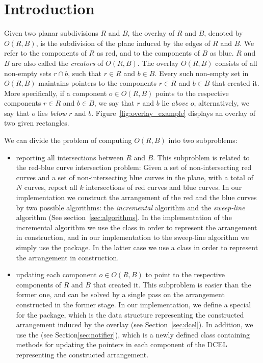 \section{Introduction}
\label{secMapOverlayIntro}
Given two planar subdivisions $R$ and $B$, 
the overlay of $R$ and $B$, 
denoted by $O(R,B)$, is the subdivision of the plane 
induced by the edges of $R$ and $B$.
We refer to the components of $R$ as red, 
and to the components of $B$ as blue.
$R$ and $B$ are also called the {\em creators} of $O(R,B)$.
The overlay $O(R,B)$ consists of all non-empty sets $r \cap b$, 
such that $r \in R$ and $b \in B$. 
Every such non-empty set in $O(R,B)$ maintains 
pointers to the components $r \in R$ and $b \in B$ that created it.
More specifically, if a component $o \in O(R,B)$ points 
to the respective components $r \in R$ and $b \in B$, 
we say that $r$ and $b$ lie {\em above} $o$, 
alternatively, we say that $o$ lies {\em below} $r$ and $b$.
Figure~\ref{fig:overlay_example} displays an overlay 
of two given rectangles.

We can divide the problem of computing $O(R,B)$ into two subproblems:
\begin{itemize}
\item reporting all intersections between $R$ and $B$.
This subproblem is related to the red-blue curve intersection 
problem: Given a set of non-intersecting red curves and a 
set of non-intersecting blue curves in the plane, 
with a total of $N$ curves, report all $k$ intersections of 
red curves and blue curves.
In our implementation we construct the arrangement of the 
red and the blue curves by two possible algorithms:
the {\it incremental} algorithm and the {\it sweep-line} 
algorithm (See section~\ref{sec:algorithms}. 
In the implementation of the incremental algorithm 
we use the  class 
in order to represent the arrangement in construction,
and in our implementation to the sweep-line algorithm 
we simply use the  package.
In the latter case we use a  class
in order to represent the arrangement in construction.

\item updating each component $o \in O(R,B)$ to point to the 
respective components of $R$ and $B$ that created it.
This subproblem is easier than the former one,
and can be solved by a single pass on the arrangement 
constructed in the former stage.
In our implementation, we define a special 
for the  package,
which is the data structure representing the constructed arrangement 
induced by the overlay (see Section~\ref{sec:dcel}).
In addition, we use the  
(see Section\ref{sec:notifier}), which is 
a newly defined class containing methods for updating the pointers 
in each component of the DCEL representing the 
constructed arrangement.
\end{itemize}

